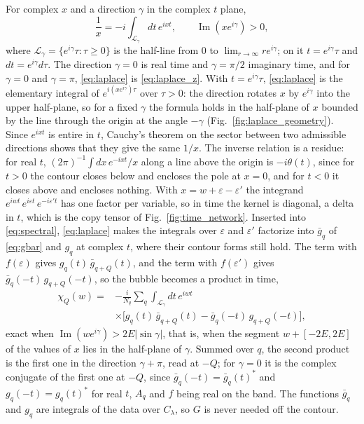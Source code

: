 \documentclass[aps,prb,reprint,a4paper]{revtex4-2}
\DeclareMathOperator{\Imag}{Im}
\begin{document}
For complex $x$ and a direction $\gamma$ in the complex $t$ plane,
\begin{equation}
  \frac1x=-i\int_{\mathcal L_\gamma}dt\,e^{ixt},\qquad\Imag(xe^{i\gamma})>0,
  \label{eq:laplace}
\end{equation}
where $\mathcal L_\gamma=\{e^{i\gamma}\tau:\tau\ge0\}$ is the half-line from $0$ to $\lim_{r\to\infty}re^{i\gamma}$; on it $t=e^{i\gamma}\tau$ and $dt=e^{i\gamma}d\tau$. The direction $\gamma=0$ is real time and $\gamma=\pi/2$ imaginary time, and for $\gamma=0$ and $\gamma=\pi$, \eqref{eq:laplace} is \eqref{eq:laplace_z}. With $t=e^{i\gamma}\tau$, \eqref{eq:laplace} is the elementary integral of $e^{i(xe^{i\gamma})\tau}$ over $\tau>0$: the direction rotates $x$ by $e^{i\gamma}$ into the upper half-plane, so for a fixed $\gamma$ the formula holds in the half-plane of $x$ bounded by the line through the origin at the angle $-\gamma$ (Fig.~\ref{fig:laplace_geometry}). Since $e^{ixt}$ is entire in $t$, Cauchy's theorem on the sector between two admissible directions shows that they give the same $1/x$. The inverse relation is a residue: for real $t$, $(2\pi)^{-1}\int dx\,e^{-ixt}/x$ along a line above the origin is $-i\theta(t)$, since for $t>0$ the contour closes below and encloses the pole at $x=0$, and for $t<0$ it closes above and encloses nothing. With $x=w+\varepsilon-\varepsilon'$ the integrand $e^{iwt}\,e^{i\varepsilon t}\,e^{-i\varepsilon't}$ has one factor per variable, so in time the kernel is diagonal, a delta in $t$, which is the copy tensor of Fig.~\ref{fig:time_network}. Inserted into \eqref{eq:spectral}, \eqref{eq:laplace} makes the integrals over $\varepsilon$ and $\varepsilon'$ factorize into $\bar g_q$ of \eqref{eq:gbar} and $g_q$ at complex $t$, where their contour forms still hold. The term with $f(\varepsilon)$ gives $g_q(t)\,\bar g_{q+Q}(t)$, and the term with $f(\varepsilon')$ gives $\bar g_q(-t)\,g_{q+Q}(-t)$, so the bubble becomes a product in time,
\begin{equation}
  \begin{aligned}
  \chi_Q(w)={}&-\frac{i}{N_q}\sum_q\int_{\mathcal L_\gamma}dt\,e^{iwt}\\
  &\times\big[g_q(t)\,\bar g_{q+Q}(t)-\bar g_q(-t)\,g_{q+Q}(-t)\big],
  \end{aligned}
  \label{eq:time_bubble}
\end{equation}
exact when $\Imag(we^{i\gamma})>2E\lvert\sin\gamma\rvert$, that is, when the segment $w+[-2E,2E]$ of the values of $x$ lies in the half-plane of $\gamma$. Summed over $q$, the second product is the first one in the direction $\gamma+\pi$, read at $-Q$; for $\gamma=0$ it is the complex conjugate of the first one at $-Q$, since $\bar g_q(-t)=\bar g_q(t)^*$ and $g_q(-t)=g_q(t)^*$ for real $t$, $A_q$ and $f$ being real on the band. The functions $\bar g_q$ and $g_q$ are integrals of the data over $C_\lambda$, so $G$ is never needed off the contour.
\end{document}
